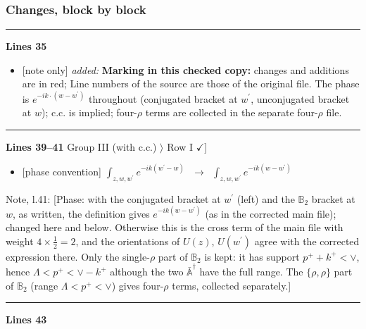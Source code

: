 \documentclass[10pt]{article}
\newenvironment{notebox}{\def\FrameCommand{{\color{notebar}\vrule width 1.5pt}\hspace{6pt}}\MakeFramed{\advance\hsize-\width\FrameRestore}\small}{\endMakeFramed}
\def\mf#1{\mathbb{#1}}
\begin{document}
\subsubsection*{Changes, block by block}
\noindent\rule{\linewidth}{0.3pt}\par\noindent\textbf{Lines 35}\par
\begin{itemize}[leftmargin=2.2em,itemsep=1pt,topsep=2pt]
\item[\textbf{l.35}] \textsf{\small [note only]} \emph{added:} \textbf{Marking in this checked copy:} changes and additions are in red;  Line numbers of the source are those of the original file. The phase is $e^{-ik\cdot(w-w^{\prime})}$ throughout (conjugated bracket at $w^{\prime}$, unconjugated bracket at $w$); c.c. is implied; four-$\rho$ terms are collected in the separate four-$\rho$ file.
\end{itemize}
\noindent\rule{\linewidth}{0.3pt}\par\noindent\textbf{Lines 39--41} \quad \textsf{Group III (with c.c.) $\rangle$ Row I { $\checkmark$]}} \par
\begin{itemize}[leftmargin=2.2em,itemsep=1pt,topsep=2pt]
\item[\textbf{l.39}] \textsf{\small [phase convention]} $\displaystyle \int_{z,w,w^{\prime}} e^{-ik(w^{\prime}-w)}\,$\ $\longrightarrow$\ $\displaystyle \int_{z,w,w^{\prime}} e^{-ik(w-w^{\prime})}\,$
\end{itemize}
\begin{notebox}\textsf{\small Note, l.41:} [Phase: with the conjugated bracket at $w^{\prime}$ (left) and the $\mf{B}_{2}$ bracket at $w$, as written, the definition gives $e^{-ik(w-w^{\prime})}$ (as in the corrected main file); changed here and below. Otherwise this is the cross term of the main file with weight $4\times\frac{1}{2}=2$, and the orientations of $U(z)$, $U(w^{\prime})$ agree with the corrected expression there. Only the single-$\rho$ part of $\mf{B}_{2}$ is kept: it has support $p^{+}+k^{+}<\vee$, hence $\Lambda<p^{+}<\vee-k^{+}$ although the two $\bar{\mf{A}}^{\dagger}$ have the full range. The $\{\rho,\rho\}$ part of $\mf{B}_{2}$ (range $\Lambda<p^{+}<\vee$) gives four-$\rho$ terms, collected separately.]\end{notebox}
\noindent\rule{\linewidth}{0.3pt}\par\noindent\textbf{Lines 43} \par
\end{document}
